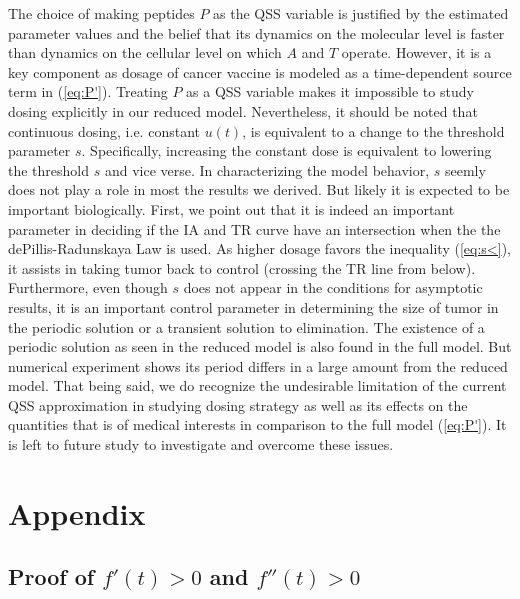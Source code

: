 \documentclass[review,authoryear]{elsarticle}
\begin{document}
The choice of making peptides $P$ as the QSS variable is justified
by the estimated parameter values and the belief that its dynamics on the molecular
level is faster than dynamics on the cellular level on which $A$
and $T$ operate. However, it is a key component as dosage of cancer
vaccine is modeled as a time-dependent source term in (\ref{eq:P'}).
Treating $P$ as a QSS variable makes it impossible to study dosing
explicitly in our reduced model. Nevertheless, it should be noted
that continuous dosing, i.e. constant $u(t)$, is equivalent to a
change to the threshold parameter $s$. Specifically, increasing the
constant dose is equivalent to lowering the threshold $s$ and vice
verse. In characterizing the model behavior, $s$ seemly does not
play a role in most the results we derived. But likely it is expected
to be important biologically. First, we point out that it is indeed
an important parameter in deciding if the IA and TR curve have an
intersection when the the dePillis-Radunskaya Law is used. As higher
dosage favors the inequality (\ref{eq:s<}), it assists in taking
tumor back to control (crossing the TR line from below). Furthermore,
even though $s$ does not appear in the conditions for asymptotic
results, it is an important control parameter in determining the size
of tumor in the periodic solution or a transient solution to elimination.
The existence of a periodic solution as seen in the reduced model
is also found in the full model. But numerical experiment shows its
period differs in a large amount from the reduced model. That being
said, we do recognize the undesirable limitation of the current QSS
approximation in studying dosing strategy as well as its effects on
the quantities that is of medical interests in comparison to the full
model (\ref{eq:P'}). It is left to future study to investigate and
overcome these issues. 

\section*{Appendix}

\subsection*{Proof of $f'(t)>0$ and $f''(t)>0$ }
\end{document}
